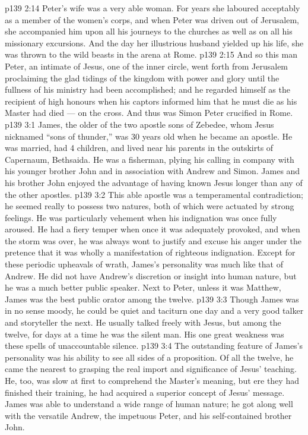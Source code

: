 \vs p139 2:14 \pc Peter’s wife was a very able woman. For years she laboured acceptably as a member of the women’s corps, and when Peter was driven out of Jerusalem, she accompanied him upon all his journeys to the churches as well as on all his missionary excursions. And the day her illustrious husband yielded up his life, she was thrown to the wild beasts in the arena at Rome.
\vs p139 2:15 \pc And so this man Peter, an intimate of Jesus, one of the inner circle, went forth from Jerusalem proclaiming the glad tidings of the kingdom with power and glory until the fullness of his ministry had been accomplished; and he regarded himself as the recipient of high honours when his captors informed him that he must die as his Master had died --- on the cross. And thus was Simon Peter crucified in Rome.
\vs p139 3:1 James, the older of the two apostle sons of Zebedee, whom Jesus nicknamed “sons of thunder,” was 30 years old when he became an apostle. He was married, had 4 children, and lived near his parents in the outskirts of Capernaum, Bethsaida. He was a fisherman, plying his calling in company with his younger brother John and in association with Andrew and Simon. James and his brother John enjoyed the advantage of having known Jesus longer than any of the other apostles.
\vs p139 3:2 \pc This able apostle was a temperamental contradiction; he seemed really to possess two natures, both of which were actuated by strong feelings. He was particularly vehement when his indignation was once fully aroused. He had a fiery temper when once it was adequately provoked, and when the storm was over, he was always wont to justify and excuse his anger under the pretence that it was wholly a manifestation of righteous indignation. Except for these periodic upheavals of wrath, James’s personality was much like that of Andrew. He did not have Andrew’s discretion or insight into human nature, but he was a much better public speaker. Next to Peter, unless it was Matthew, James was the best public orator among the twelve.
\vs p139 3:3 Though James was in no sense moody, he could be quiet and taciturn one day and a very good talker and storyteller the next. He usually talked freely with Jesus, but among the twelve, for days at a time he was the silent man. His one great weakness was these spells of unaccountable silence.
\vs p139 3:4 The outstanding feature of James’s personality was his ability to see all sides of a proposition. Of all the twelve, he came the nearest to grasping the real import and significance of Jesus’ teaching. He, too, was slow at first to comprehend the Master’s meaning, but ere they had finished their training, he had acquired a superior concept of Jesus’ message. James was able to understand a wide range of human nature; he got along well with the versatile Andrew, the impetuous Peter, and his self\hyp{}contained brother John.
